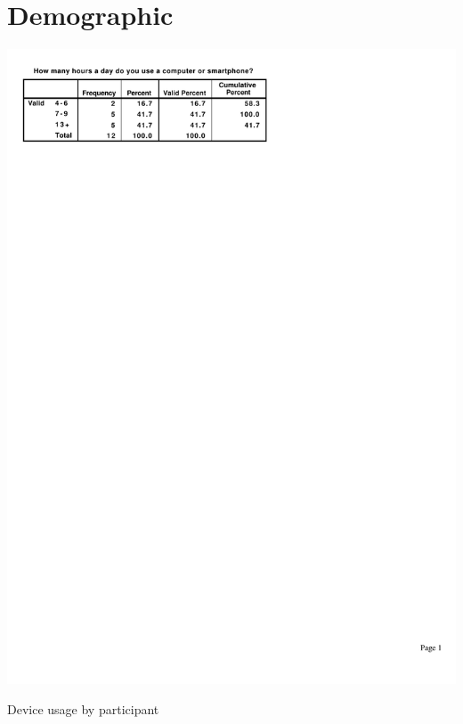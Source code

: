 \documentclass[11pt,openright,a4paper]{report}
\begin{document}
\section{Demographic}
\begin{table}[ht]
\centerline{\includegraphics{figures/ComputerHours.pdf}}
\caption{Device usage by participant}
\label{fig:partic_computerHours}
\end{table}
\end{document}

